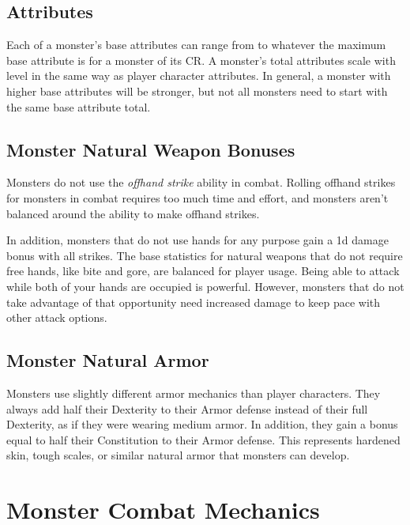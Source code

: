     \subsection{Attributes}
        Each of a monster's base attributes can range from  to whatever the maximum base attribute is for a monster of its CR.
        A monster's total attributes scale with level in the same way as player character attributes.
        In general, a monster with higher base attributes will be stronger, but not all monsters need to start with the same base attribute total.

    \subsection{Monster Natural Weapon Bonuses}\label{Monster Natural Weapon Bonuses}
        Monsters do not use the \textit{offhand strike} ability in combat.
        Rolling offhand strikes for monsters in combat requires too much time and effort, and monsters aren't balanced around the ability to make offhand strikes.

        In addition, monsters that do not use hands for any purpose gain a \plus1d damage bonus with all strikes.
        The base statistics for natural weapons that do not require free hands, like bite and gore, are balanced for player usage.
        Being able to attack while both of your hands are occupied is powerful.
        However, monsters that do not take advantage of that opportunity need increased damage to keep pace with other attack options.

    \subsection{Monster Natural Armor}\label{Monster Natural Armor}
        Monsters use slightly different armor mechanics than player characters.
        They always add half their Dexterity to their Armor defense instead of their full Dexterity, as if they were wearing medium armor.
        In addition, they gain a bonus equal to half their Constitution to their Armor defense.
        This represents hardened skin, tough scales, or similar natural armor that monsters can develop.

\section{Monster Combat Mechanics}

